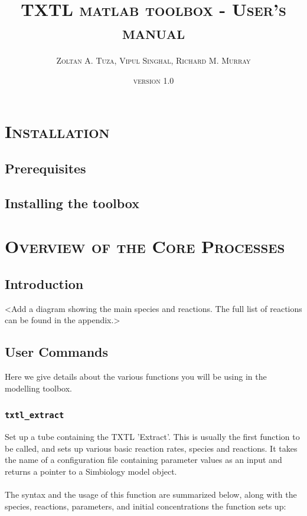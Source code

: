 \documentclass[english]{report}
\begin{document}
\title{\textsc{TXTL matlab toolbox - User's manual}}
\date{\textsc{version 1.0}}
\author{\textsc{Zoltan A. Tuza, Vipul Singhal, Richard M. Murray}}
\maketitle
\textsc{\tableofcontents}



\chapter{\textsc{Installation}}
	\section{Prerequisites}
	\section{Installing the toolbox}
	
\chapter{\textsc{Overview of the Core Processes}} %
	\section{Introduction}
	<Add a diagram showing the main species and reactions. The full list of reactions can be found in the appendix.>
	\section{User Commands}	
	Here we give details about the various functions you will be using in the modelling toolbox. 	

		\subsection*{\texttt{txtl\_extract}}
			Set up a tube containing the TXTL 'Extract'. This is usually the first function to be called, and sets up various basic reaction rates, species and reactions. It takes the name of a configuration file containing parameter values as an input and returns a pointer to a Simbiology model object.  \\	
			\\
			The syntax and the usage of this function are summarized below, along with the species, reactions, parameters, and initial concentrations the function sets up:
			
\end{document}

